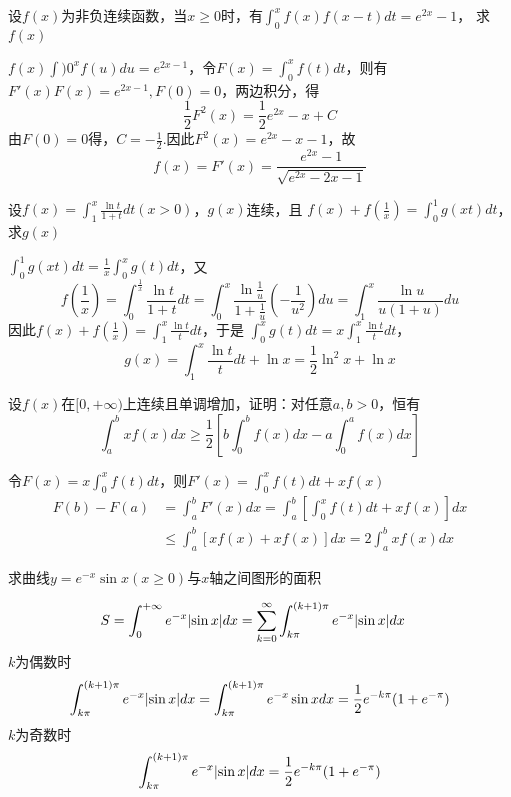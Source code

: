 \documentclass{article}
\begin{document}
\begin{examplle}[]
设\(f(x)\)为非负连续函数，当\(x\ge0\)时，有\(\int_0^xf(x)f(x-t)dt=e^{2x}-1\)，
求\(f(x)\)

\(f(x)\int)0^xf(u)du=e^{2x-1}\)，令\(F(x)=\int_0^xf(t)dt\)，则有
\(F'(x)F(x)=e^{2x-1},F(0)=0\)，两边积分，得
\begin{equation*}
\frac{1}{2}F^2(x)=\frac{1}{2}e^{2x}-x+C
\end{equation*}
由\(F(0)=0\)得，\(C=-\frac{1}{2}\).因此\(F^2(x)=e^{2x}-x-1\)，故
\begin{equation*}
f(x)=F'(x)=\frac{e^{2x}-1}{\sqrt{e^{2x}-2x-1}}
\end{equation*}
\end{examplle}

\begin{examplle}[]
设\(\displaystyle f(x)=\int_1^x\frac{\ln t}{1+t}dt(x>0)\)，\(g(x)\)连续，且
\(f(x)+f(\frac{1}{x})=\int_0^1g(xt)dt\)，求\(g(x)\)

\(\int_0^1g(xt)dt=\frac{1}{x}\int_0^xg(t)dt\)，又
\begin{equation*}
f(\frac{1}{x})=\int_0^{\frac{1}{x}}\frac{\ln t}{1+t}dt=
\int_0^x\frac{\ln\frac{1}{u}}{1+\frac{1}{u}}(-\frac{1}{u^2})du=
\int_1^x\frac{\ln u}{u(1+u)}du
\end{equation*}
因此\(f(x)+f(\frac{1}{x})=\int_1^x\frac{\ln t}{t}dt\)，于是
\(\int_0^xg(t)dt=x\int_1^x\frac{\ln t}{t}dt\)，
\begin{equation*}
g(x)=\int_1^x\frac{\ln t}{t}dt+\ln x=\frac{1}{2}\ln^2x+\ln x
\end{equation*}
\end{examplle}

\begin{examplle}[]
设\(f(x)\)在\([0,+\infty)\)上连续且单调增加，证明：对任意\(a,b>0\)，恒有
\begin{equation*}
\int_a^bxf(x)dx\ge\frac{1}{2}\left[
b\int_0^bf(x)dx-a\int_0^af(x)dx
\right]
\end{equation*}

令\(F(x)=x\int_0^xf(t)dt\)，则\(F'(x)=\int_0^xf(t)dt+xf(x)\)
\begin{align*}
F(b)-F(a)&=\int_a^bF'(x)dx=\int_a^b
\left[\int_0^xf(t)dt+xf(x)
\right]dx\\
&\le\int_a^b[xf(x)+xf(x)]dx=2\int_a^bxf(x)dx
\end{align*}
\end{examplle}

\begin{examplle}[]
求曲线\(y=e^{-x}\sin x(x\ge0)\)与\(x\)轴之间图形的面积

\begin{align*}
S&=\int_0^{+\infty}e^{-x}\abs{\sin x}dx=
\sum_{k=0}^{\infty}\int_{k\pi}^{(k+1)\pi}e^{-x}\abs{\sin x}dx
\end{align*}
\(k\)为偶数时
\begin{equation*}
\int_{k\pi}^{(k+1)\pi}e^{-x}\abs{\sin x}dx=
\int_{k\pi}^{(k+1)\pi}e^{-x}\sin xdx=
\frac{1}{2}e^{-k\pi}(1+e^{-\pi})
\end{equation*}
\(k\)为奇数时
\begin{equation*}
\int_{k\pi}^{(k+1)\pi}e^{-x}\abs{\sin x}dx=\frac{1}{2}e^{-k\pi}(1+e^{-\pi})
\end{equation*}
\end{examplle}
\end{document}
